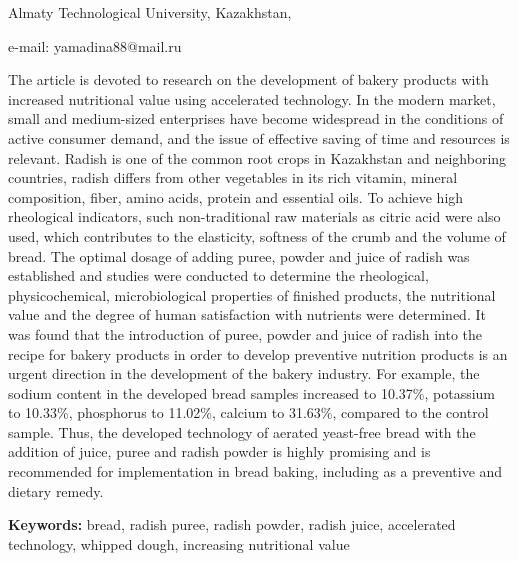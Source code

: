 \begin{affiliation}
Almaty Technological University, Kazakhstan,

e-mail: yamadina88@mail.ru
\end{affiliation}

The article is devoted to research on the development of bakery products
with increased nutritional value using accelerated technology. In the
modern market, small and medium-sized enterprises have become widespread
in the conditions of active consumer demand, and the issue of effective
saving of time and resources is relevant. Radish is one of the common
root crops in Kazakhstan and neighboring countries, radish differs from
other vegetables in its rich vitamin, mineral composition, fiber, amino
acids, protein and essential oils. To achieve high rheological
indicators, such non-traditional raw materials as citric acid were also
used, which contributes to the elasticity, softness of the crumb and the
volume of bread. The optimal dosage of adding puree, powder and juice of
radish was established and studies were conducted to determine the
rheological, physicochemical, microbiological properties of finished
products, the nutritional value and the degree of human satisfaction
with nutrients were determined. It was found that the introduction of
puree, powder and juice of radish into the recipe for bakery products in
order to develop preventive nutrition products is an urgent direction in
the development of the bakery industry. For example, the sodium content
in the developed bread samples increased to 10.37\%, potassium to
10.33\%, phosphorus to 11.02\%, calcium to 31.63\%, compared to the
control sample. Thus, the developed technology of aerated yeast-free
bread with the addition of juice, puree and radish powder is highly
promising and is recommended for implementation in bread baking,
including as a preventive and dietary remedy.

{\bfseries Keywords:} bread, radish puree, radish powder, radish juice,
accelerated technology, whipped dough, increasing nutritional value

